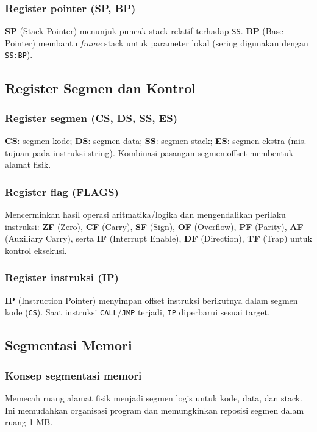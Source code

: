 \subsubsection{Register pointer (SP, BP)}
\textbf{SP} (Stack Pointer) menunjuk puncak stack relatif terhadap \texttt{SS}. \textbf{BP} (Base Pointer) membantu \textit{frame} stack untuk parameter lokal (sering digunakan dengan \texttt{SS:BP}).

\subsection{Register Segmen dan Kontrol}\label{subsec:arsitektur-segmen-kontrol}
\subsubsection{Register segmen (CS, DS, SS, ES)}
\textbf{CS}: segmen kode; \textbf{DS}: segmen data; \textbf{SS}: segmen stack; \textbf{ES}: segmen ekstra (mis. tujuan pada instruksi string). Kombinasi pasangan segmen:offset membentuk alamat fisik.

\subsubsection{Register flag (FLAGS)}
Mencerminkan hasil operasi aritmatika/logika dan mengendalikan perilaku instruksi: \textbf{ZF} (Zero), \textbf{CF} (Carry), \textbf{SF} (Sign), \textbf{OF} (Overflow), \textbf{PF} (Parity), \textbf{AF} (Auxiliary Carry), serta \textbf{IF} (Interrupt Enable), \textbf{DF} (Direction), \textbf{TF} (Trap) untuk kontrol eksekusi.

\subsubsection{Register instruksi (IP)}
\textbf{IP} (Instruction Pointer) menyimpan offset instruksi berikutnya dalam segmen kode (\texttt{CS}). Saat instruksi \texttt{CALL}/\texttt{JMP} terjadi, \texttt{IP} diperbarui sesuai target.

\subsection{Segmentasi Memori}
\subsubsection{Konsep segmentasi memori}
Memecah ruang alamat fisik menjadi segmen logis untuk kode, data, dan stack. Ini memudahkan organisasi program dan memungkinkan reposisi segmen dalam ruang 1 MB.


